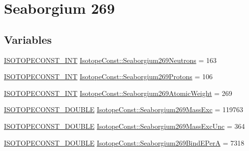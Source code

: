 \hypertarget{group___isotope_const-_seaborgium-_sg269}{}\section{Seaborgium 269}
\label{group___isotope_const-_seaborgium-_sg269}
\subsection*{Variables}
\begin{DoxyCompactItemize}
\item 
\mbox{\hyperlink{group___isotope_const-_macros_ga5f18360b3e99483a35c32d789e62621c}{I\+S\+O\+T\+O\+P\+E\+C\+O\+N\+S\+T\+\_\+\+I\+NT}} \mbox{\hyperlink{group___isotope_const-_seaborgium-_sg269_gaf476a6c19fae7e4f9acfb1fbbe7ea61b}{Isotope\+Const\+::\+Seaborgium269\+Neutrons}} = 163
\item 
\mbox{\hyperlink{group___isotope_const-_macros_ga5f18360b3e99483a35c32d789e62621c}{I\+S\+O\+T\+O\+P\+E\+C\+O\+N\+S\+T\+\_\+\+I\+NT}} \mbox{\hyperlink{group___isotope_const-_seaborgium-_sg269_ga19951cae59369357dac39bec1469ffd2}{Isotope\+Const\+::\+Seaborgium269\+Protons}} = 106
\item 
\mbox{\hyperlink{group___isotope_const-_macros_ga5f18360b3e99483a35c32d789e62621c}{I\+S\+O\+T\+O\+P\+E\+C\+O\+N\+S\+T\+\_\+\+I\+NT}} \mbox{\hyperlink{group___isotope_const-_seaborgium-_sg269_ga83d6a1fb11bd8acb9d2ebdb85fd90f11}{Isotope\+Const\+::\+Seaborgium269\+Atomic\+Weight}} = 269
\item 
\mbox{\hyperlink{group___isotope_const-_macros_ga8f45a7272ce02c0b4c65c44636ed719a}{I\+S\+O\+T\+O\+P\+E\+C\+O\+N\+S\+T\+\_\+\+D\+O\+U\+B\+LE}} \mbox{\hyperlink{group___isotope_const-_seaborgium-_sg269_ga18fa070d5592933e34a4557924685dca}{Isotope\+Const\+::\+Seaborgium269\+Mass\+Exc}} = 119763
\item 
\mbox{\hyperlink{group___isotope_const-_macros_ga8f45a7272ce02c0b4c65c44636ed719a}{I\+S\+O\+T\+O\+P\+E\+C\+O\+N\+S\+T\+\_\+\+D\+O\+U\+B\+LE}} \mbox{\hyperlink{group___isotope_const-_seaborgium-_sg269_ga9528f3852c687923c414d1bf674994e3}{Isotope\+Const\+::\+Seaborgium269\+Mass\+Exc\+Unc}} = 364
\item 
\mbox{\hyperlink{group___isotope_const-_macros_ga8f45a7272ce02c0b4c65c44636ed719a}{I\+S\+O\+T\+O\+P\+E\+C\+O\+N\+S\+T\+\_\+\+D\+O\+U\+B\+LE}} \mbox{\hyperlink{group___isotope_const-_seaborgium-_sg269_gae51a6fcfdfe0731625a609de5d4079cb}{Isotope\+Const\+::\+Seaborgium269\+Bind\+E\+PerA}} = 7318
\item 

\end{DoxyCompactItemize}
